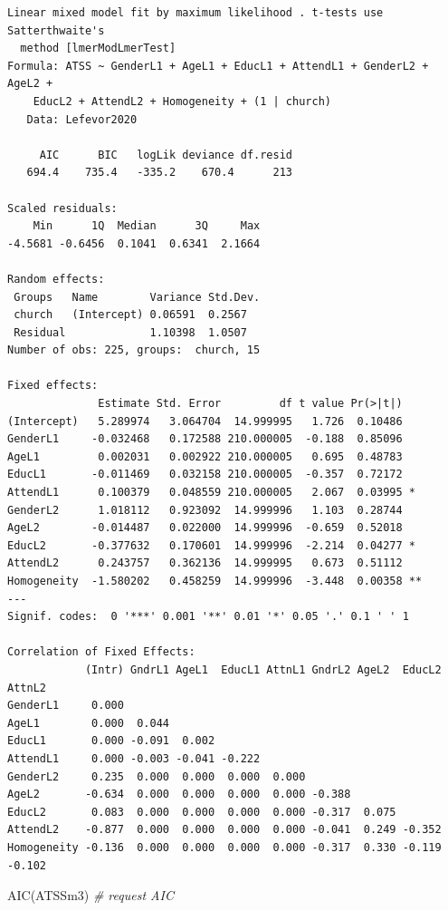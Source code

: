 \documentclass[
  english,
]{book}
\newenvironment{Shaded}{\begin{snugshade}}{\end{snugshade}}
\newcommand{\CommentTok}[1]{\textcolor[rgb]{0.56,0.35,0.01}{\textit{#1}}}
\newcommand{\FunctionTok}[1]{\textcolor[rgb]{0.00,0.00,0.00}{#1}}
\newcommand{\NormalTok}[1]{#1}
\begin{document}
\begin{verbatim}
Linear mixed model fit by maximum likelihood . t-tests use Satterthwaite's
  method [lmerModLmerTest]
Formula: ATSS ~ GenderL1 + AgeL1 + EducL1 + AttendL1 + GenderL2 + AgeL2 +  
    EducL2 + AttendL2 + Homogeneity + (1 | church)
   Data: Lefevor2020

     AIC      BIC   logLik deviance df.resid 
   694.4    735.4   -335.2    670.4      213 

Scaled residuals: 
    Min      1Q  Median      3Q     Max 
-4.5681 -0.6456  0.1041  0.6341  2.1664 

Random effects:
 Groups   Name        Variance Std.Dev.
 church   (Intercept) 0.06591  0.2567  
 Residual             1.10398  1.0507  
Number of obs: 225, groups:  church, 15

Fixed effects:
              Estimate Std. Error         df t value Pr(>|t|)   
(Intercept)   5.289974   3.064704  14.999995   1.726  0.10486   
GenderL1     -0.032468   0.172588 210.000005  -0.188  0.85096   
AgeL1         0.002031   0.002922 210.000005   0.695  0.48783   
EducL1       -0.011469   0.032158 210.000005  -0.357  0.72172   
AttendL1      0.100379   0.048559 210.000005   2.067  0.03995 * 
GenderL2      1.018112   0.923092  14.999996   1.103  0.28744   
AgeL2        -0.014487   0.022000  14.999996  -0.659  0.52018   
EducL2       -0.377632   0.170601  14.999996  -2.214  0.04277 * 
AttendL2      0.243757   0.362136  14.999995   0.673  0.51112   
Homogeneity  -1.580202   0.458259  14.999996  -3.448  0.00358 **
---
Signif. codes:  0 '***' 0.001 '**' 0.01 '*' 0.05 '.' 0.1 ' ' 1

Correlation of Fixed Effects:
            (Intr) GndrL1 AgeL1  EducL1 AttnL1 GndrL2 AgeL2  EducL2 AttnL2
GenderL1     0.000                                                        
AgeL1        0.000  0.044                                                 
EducL1       0.000 -0.091  0.002                                          
AttendL1     0.000 -0.003 -0.041 -0.222                                   
GenderL2     0.235  0.000  0.000  0.000  0.000                            
AgeL2       -0.634  0.000  0.000  0.000  0.000 -0.388                     
EducL2       0.083  0.000  0.000  0.000  0.000 -0.317  0.075              
AttendL2    -0.877  0.000  0.000  0.000  0.000 -0.041  0.249 -0.352       
Homogeneity -0.136  0.000  0.000  0.000  0.000 -0.317  0.330 -0.119 -0.102
\end{verbatim}

\begin{Shaded}
\begin{Highlighting}[]
\FunctionTok{AIC}\NormalTok{(ATSSm3) }\CommentTok{\# request AIC}
\end{Highlighting}
\end{Shaded}
\end{document}
